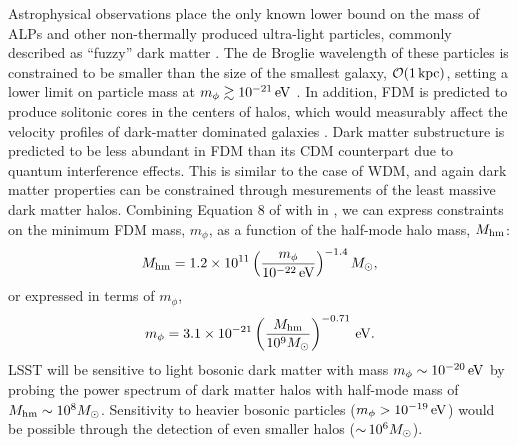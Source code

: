 Astrophysical observations place the only known lower bound on the mass of ALPs and other non-thermally produced ultra-light particles, commonly described as ``fuzzy'' dark matter \citep[FDM; \eg,][]{Hu:2000,Hui:2017}. 
The de Broglie wavelength of these particles is constrained to be smaller than the size of the smallest galaxy, $\mathcal{O}(1\mathrm{\,kpc})$, setting a lower limit on particle mass at $m_\phi \gtrsim 10^{-21}\mathrm{\,eV}$ \citep{1703.04683}. 
In addition, FDM is predicted to produce solitonic cores in the centers of halos, which would measurably affect the velocity profiles of dark-matter dominated galaxies \citep{Robles:2012uy,Robles:2018fur,Schive:2014hza,Du:2016aik}. 
Dark matter substructure is predicted to be less abundant in FDM than its CDM counterpart due to quantum interference effects.
This is similar to the case of WDM, and again dark matter properties can be constrained through mesurements of the least massive dark matter halos.
Combining Equation 8 of \citet[][]{1703.09126} with  in , we can express constraints on the minimum FDM mass, $m_\phi$, as a function of the half-mode halo mass, $M_{\rm hm}$:
\begin{equation}
M_{\rm hm} = 1.2 \times 10^{11} \left( \frac{m_\phi}{10^{-22}\mathrm{\,eV}} \right)^{-1.4} M_\odot,
\end{equation}
or expressed in terms of $m_\phi$, 
\begin{equation}
m_\phi = 3.1 \times 10^{-21} \left( \frac{M_{\rm hm}}{10^{9}M_\odot} \right)^{-0.71} \mathrm{\,eV}.
\end{equation}
LSST will be sensitive to light bosonic dark matter with mass $m_\phi \sim 10^{-20} \mathrm{\,eV}$ by probing the power spectrum of dark matter halos with half-mode mass of $M_{\rm hm} \sim 10^{8} M_\odot$. 
Sensitivity to heavier bosonic particles ($m_\phi > 10^{-19} \mathrm{\,eV}$) would be possible through the detection of even smaller halos ($ {\sim}\, 10^{6} M_\odot$).




